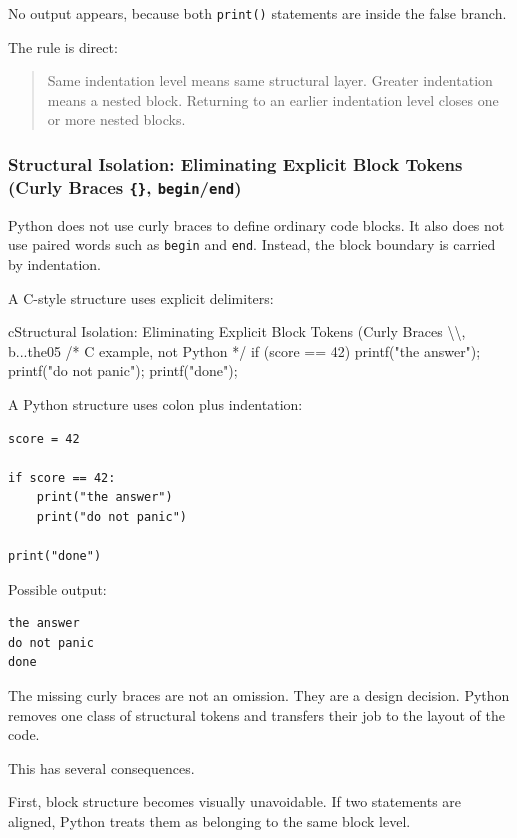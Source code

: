 \documentclass[a4paper,twoside]{report}
\begin{document}
No output appears, because both \texttt{print()} statements are inside the false branch.

The rule is direct:

\begin{quote}
Same indentation level means same structural layer. Greater indentation means a nested block. Returning to an earlier indentation level closes one or more nested blocks.
\end{quote}

\subsubsection{Structural Isolation: Eliminating Explicit Block Tokens (Curly Braces \texttt{\{\}}, \texttt{begin}/\texttt{end})}

Python does not use curly braces to define ordinary code blocks. It also does not use paired words such as \texttt{begin} and \texttt{end}. Instead, the block boundary is carried by indentation.

A C-style structure uses explicit delimiters:

\begin{codebox}[]{c}{Structural Isolation: Eliminating Explicit Block Tokens (Curly Braces \textbackslash{}{\textbackslash{}}, b...}{the05}
/* C example, not Python */
if (score == 42) {
    printf("the answer\n");
    printf("do not panic\n");
}
printf("done\n");
\end{codebox}


A Python structure uses colon plus indentation:

\begin{verbatim}
score = 42

if score == 42:
    print("the answer")
    print("do not panic")

print("done")
\end{verbatim}

Possible output:

\begin{verbatim}
the answer
do not panic
done
\end{verbatim}

The missing curly braces are not an omission. They are a design decision. Python removes one class of structural tokens and transfers their job to the layout of the code.

This has several consequences.

First, block structure becomes visually unavoidable. If two statements are aligned, Python treats them as belonging to the same block level.
\end{document}
